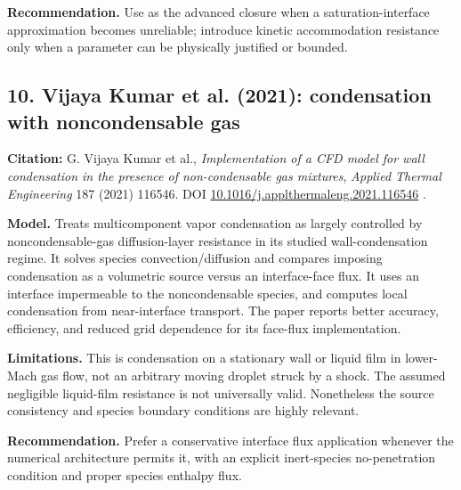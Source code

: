 \documentclass[11pt,letterpaper]{article}
\begin{document}
\textbf{Recommendation.} Use as the advanced closure when a saturation-interface approximation becomes unreliable; introduce kinetic accommodation resistance only when a parameter can be physically justified or bounded.

\subsection{10. Vijaya Kumar et al. (2021): condensation with noncondensable gas}
\textbf{Citation:} G. Vijaya Kumar et al., \emph{Implementation of a CFD model for wall condensation in the presence of non-condensable gas mixtures}, \emph{Applied Thermal Engineering} 187 (2021) 116546. DOI \href{https://doi.org/10.1016/j.applthermaleng.2021.116546}{10.1016/j.applthermaleng.2021.116546} \cite{VijayaKumar2021}.

\textbf{Model.} Treats multicomponent vapor condensation as largely controlled by noncondensable-gas diffusion-layer resistance in its studied wall-condensation regime. It solves species convection/diffusion and compares imposing condensation as a volumetric source versus an interface-face flux. It uses an interface impermeable to the noncondensable species, and computes local condensation from near-interface transport. The paper reports better accuracy, efficiency, and reduced grid dependence for its face-flux implementation.

\textbf{Limitations.} This is condensation on a stationary wall or liquid film in lower-Mach gas flow, not an arbitrary moving droplet struck by a shock. The assumed negligible liquid-film resistance is not universally valid. Nonetheless the source consistency and species boundary conditions are highly relevant.

\textbf{Recommendation.} Prefer a conservative interface flux application whenever the numerical architecture permits it, with an explicit inert-species no-penetration condition and proper species enthalpy flux.
\end{document}
